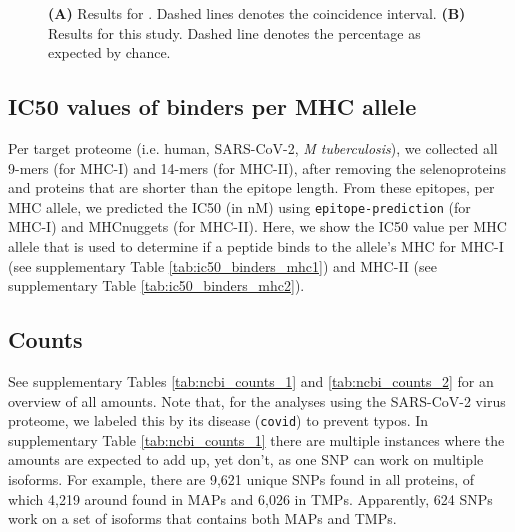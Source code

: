 \begin{figure}
  \caption{
    \textbf{(A)} 
    Results for \cite{bianchi2017}. 
    Dashed lines denotes the coincidence interval.
    \textbf{(B)}
    Results for this study.
    Dashed line denotes the percentage as expected by chance.
  }
\end{figure}

\clearpage

\subsection{IC50 values of binders per MHC allele}
\label{subsec:ic50s_per_haplotype}

Per target proteome (i.e. human, SARS-CoV-2, \emph{M tuberculosis}),
we collected all 9-mers (for MHC-I) and 14-mers (for MHC-II),
after removing the selenoproteins and proteins that are shorter
than the epitope length.
From these epitopes, per MHC allele,
we predicted the IC50 (in nM) using \verb;epitope-prediction; (for MHC-I)
and MHCnuggets (for MHC-II). 
Here, we show the IC50 value per MHC allele that
is used to determine if a peptide binds to the allele's MHC
for MHC-I (see supplementary Table \ref{tab:ic50_binders_mhc1}) and 
MHC-II (see supplementary Table \ref{tab:ic50_binders_mhc2}).





\clearpage

\subsection{Counts}
\label{subsec:counts}

See supplementary Tables \ref{tab:ncbi_counts_1} and \ref{tab:ncbi_counts_2}
for an overview of all amounts. 
Note that, for the analyses using the SARS-CoV-2 virus proteome,
we labeled this by its disease (\verb;covid;) to prevent typos.
In supplementary Table \ref{tab:ncbi_counts_1} there are multiple instances where
the amounts are expected to add up, yet don't, as one SNP can work on
multiple isoforms. For example, there are 9,621 unique SNPs 
found in all proteins, of which 4,219 around found in MAPs 
and 6,026 in TMPs. Apparently, 624 SNPs work on a set of isoforms that
contains both MAPs and TMPs.

